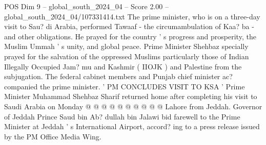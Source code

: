 \begin{textsample}{POS Dim 9 – global\_south\_2024\_04 – Score 2.00 – global\_south\_2024\_04/107331414.txt}
The prime minister, who is on a three-day visit to Sau? di Arabia, performed Tawaaf - the circumambulation of Kaa? ba - and other obligations.
He prayed for the country ' s progress and prosperity, the Muslim Ummah ' s unity, and global peace.
Prime Minister Shehbaz specially prayed for the salvation of the oppressed Muslims particularly those of Indian Illegally Occupied Jam? mu and Kashmir ( IIOJK ) and Palestine from the subjugation.
The federal cabinet members and Punjab chief minister ac? companied the prime minister. ' PM CONCLUDES VISIT TO KSA ' Prime Minister Muhammad Shehbaz Sharif returned home after completing his visit to Saudi Arabia on Monday @ @ @ @ @ @ @ @ @ @ Lahore from Jeddah.
Governor of Jeddah Prince Saud bin Ab? dullah bin Jalawi bid farewell to the Prime Minister at Jeddah ' s International Airport, accord? ing to a press release issued by the PM Office Media Wing.

\end{textsample}
